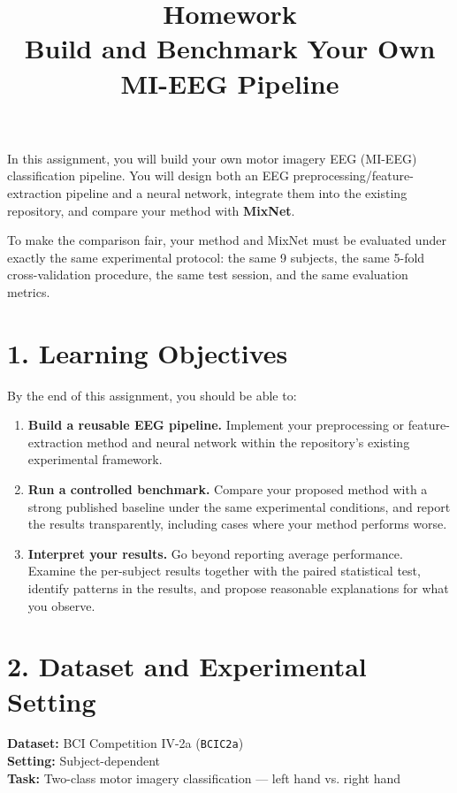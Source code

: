 \documentclass[
  10pt,
]{article}
\title{Homework\\Build and Benchmark Your Own MI-EEG Pipeline}
\author{}
\date{}
\begin{document}
\maketitle

{
\setcounter{tocdepth}{2}
\tableofcontents
}

In this assignment, you will build your own motor imagery EEG (MI-EEG)
classification pipeline. You will design both an EEG
preprocessing/feature-extraction pipeline and a neural network,
integrate them into the existing repository, and compare your method
with \textbf{MixNet}.

To make the comparison fair, your method and MixNet must be evaluated
under exactly the same experimental protocol: the same 9 subjects, the
same 5-fold cross-validation procedure, the same test session, and the
same evaluation metrics.

\section{1. Learning Objectives}\label{learning-objectives}

By the end of this assignment, you should be able to:

\begin{enumerate}
\def\labelenumi{\arabic{enumi}.}
\item
  \textbf{Build a reusable EEG pipeline.}
  Implement your preprocessing or feature-extraction method and neural
  network within the repository's existing experimental framework.
\item
  \textbf{Run a controlled benchmark.}
  Compare your proposed method with a strong published baseline under
  the same experimental conditions, and report the results
  transparently, including cases where your method performs worse.
\item
  \textbf{Interpret your results.}
  Go beyond reporting average performance. Examine the per-subject
  results together with the paired statistical test, identify patterns
  in the results, and propose reasonable explanations for what you
  observe.
\end{enumerate}

\section{2. Dataset and Experimental Setting}\label{dataset-and-experimental-setting}

\textbf{Dataset:} BCI Competition IV-2a (\texttt{BCIC2a})\\
\textbf{Setting:} Subject-dependent\\
\textbf{Task:} Two-class motor imagery classification --- left hand vs.
right hand
\end{document}
